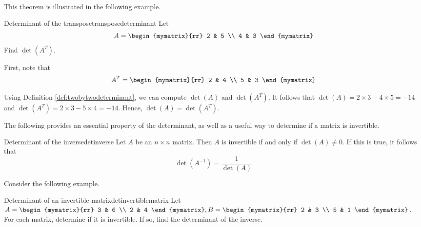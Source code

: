 This theorem is illustrated in the following example. 

\begin{example}{Determinant of the transpose}{transposedeterminant}
Let
\begin{equation*}
A
=
\begin{mymatrix}{rr}
2 & 5 \\
4 & 3
\end{mymatrix}
\end{equation*}
Find $\det \left(A^T\right)$.
\end{example}

\begin{solution}
First, note that 
\begin{equation*}
A^{T}
=
\begin{mymatrix}{rr}
2 & 4 \\
5 & 3
\end{mymatrix}
\end{equation*}

Using Definition \ref{def:twobytwodeterminant}, we can compute $\det \left(A\right)$ and $\det \left(A^T\right)$. It follows that
$\det \left(A\right) = 2 \times 3 - 4 \times 5 = -14$ and $\det \left(A^T\right) = 2 \times 3 - 5 \times 4 = -14$. 
Hence, $\det \left(A\right) = \det \left(A^T\right)$.
\end{solution}

The following provides an essential property of the determinant, as well as a useful way to determine if a matrix is invertible.

\begin{theorem}{Determinant of the inverse}{detinverse}
Let $A$ be an $n \times n$ matrix. Then $A$ is invertible if and only if $\det(A) \neq 0$. If this is true, it follows that 
\[
\det(A^{-1}) = \frac{1}{\det(A)}
\]
\end{theorem}

Consider the following example.

\begin{example}{Determinant of an invertible matrix}{detinvertiblematrix}
Let $A = \begin{mymatrix}{rr}
3 & 6 \\
2 & 4 
\end{mymatrix}, B = \begin{mymatrix}{rr}
2 & 3 \\
5 & 1
\end{mymatrix}$. For each matrix, determine if it is invertible. If so, find the determinant of the inverse. 
\end{example}

